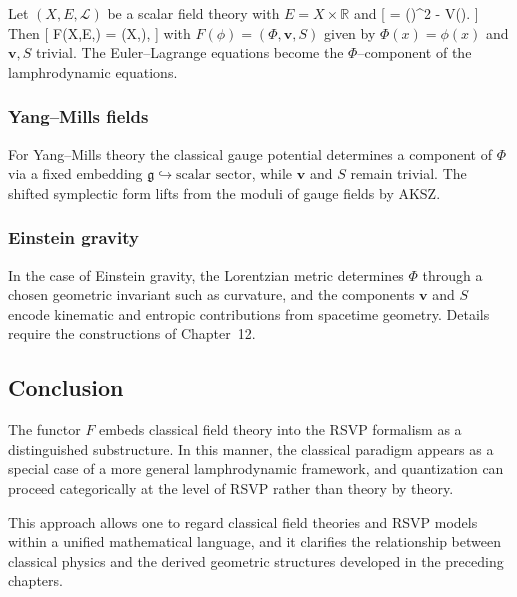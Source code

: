 Let $(X,E,\mathcal{L})$ be a scalar field theory with $E = X \times \mathbb{R}$ and
[
 = (\partial\phi)^2 - V(\phi).
]
Then
[
F(X,E,) = \Map(X,\Plenum),
]
with $F(\phi) = (\Phi,\mathbf v,S)$ given by $\Phi(x) = \phi(x)$ and $\mathbf v,S$ trivial. The Euler--Lagrange equations become the $\Phi$--component of the lamphrodynamic equations.

\subsubsection{Yang--Mills fields}

For Yang--Mills theory the classical gauge potential determines a component of $\Phi$ via a fixed embedding $\mathfrak{g}\hookrightarrow\text{scalar sector}$, while $\mathbf v$ and $S$ remain trivial. The shifted symplectic form lifts from the moduli of gauge fields by AKSZ.

\subsubsection{Einstein gravity}

In the case of Einstein gravity, the Lorentzian metric determines $\Phi$ through a chosen geometric invariant such as curvature, and the components $\mathbf v$ and $S$ encode kinematic and entropic contributions from spacetime geometry. Details require the constructions of Chapter~12.

\subsection{Conclusion}

The functor $F$ embeds classical field theory into the RSVP formalism as a distinguished substructure. In this manner, the classical paradigm appears as a special case of a more general lamphrodynamic framework, and quantization can proceed categorically at the level of RSVP rather than theory by theory.

\begin{remark}
This approach allows one to regard classical field theories and RSVP models within a unified mathematical language, and it clarifies the relationship between classical physics and the derived geometric structures developed in the preceding chapters.
\end{remark}

